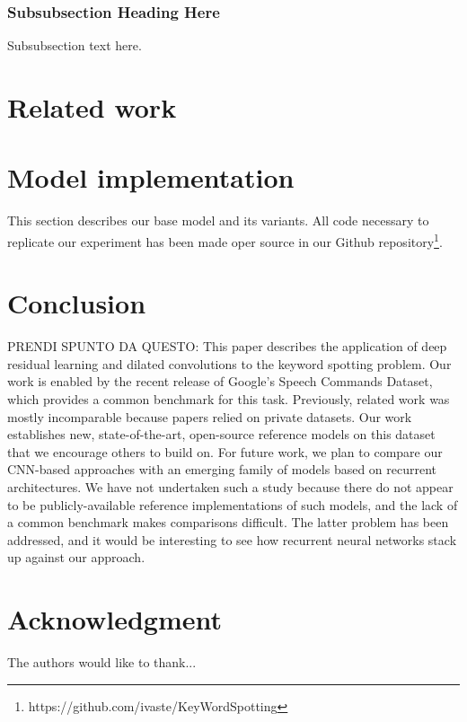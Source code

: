 \documentclass[conference]{IEEEtran}
\begin{document}
\subsubsection{Subsubsection Heading Here}
Subsubsection text here.

\section{Related work}
\section{Model implementation}
This section describes our base model and its variants. All code necessary to replicate our experiment has been made oper source in our Github repository\footnote{https://github.com/ivaste/KeyWordSpotting}.
\section{Conclusion}
PRENDI SPUNTO DA QUESTO: This paper describes the application of deep residual learning and dilated convolutions to the keyword spotting problem. Our work is enabled by the recent release of Google’s Speech Commands Dataset, which provides a common benchmark for this task. Previously, related work was mostly incomparable because papers relied on private datasets. Our work establishes new, state-of-the-art, open-source reference models on this dataset that we encourage others to build on. For future work, we plan to compare our CNN-based approaches with an emerging family of models based on recurrent architectures. We have not undertaken such a study because there do not appear to be publicly-available reference implementations of such models, and the lack of a common benchmark makes comparisons difficult. The latter problem has been addressed, and it would be interesting to see how
recurrent neural networks stack up against our approach.

\section*{Acknowledgment}


The authors would like to thank...
\end{document}
